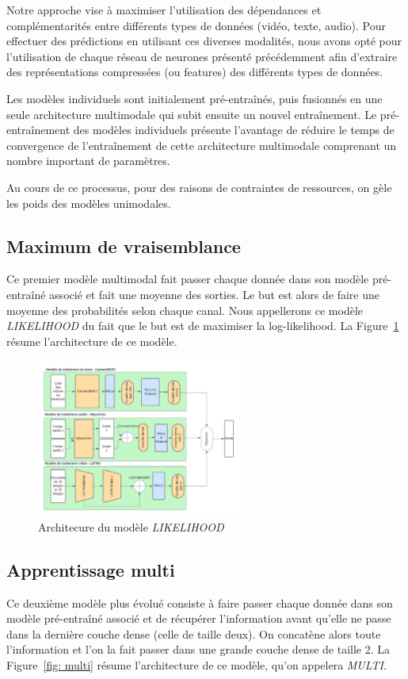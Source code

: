\documentclass[a4paper]{article}
\begin{document}
Notre approche vise à maximiser l'utilisation des dépendances et complémentarités entre différents types de données (vidéo, texte,
audio). Pour effectuer des prédictions en utilisant ces diverses modalités, nous avons opté pour l'utilisation de chaque réseau de
neurones présenté précédemment afin d'extraire des représentations compressées (ou features) des différents types de données. 

Les modèles individuels sont initialement pré-entraînés, puis fusionnés en une seule architecture multimodale qui subit ensuite un
nouvel entraînement. Le pré-entraînement des modèles individuels présente l'avantage de réduire le temps de convergence de
l'entraînement de cette architecture multimodale comprenant un nombre important de paramètres.

Au cours de ce processus, pour des raisons de contraintes de ressources, on gèle les poids des modèles unimodales.

\subsection{Maximum de vraisemblance}
Ce premier modèle multimodal fait passer chaque donnée dans son modèle pré-entraîné associé et fait une moyenne des sorties. Le but
est alors de faire une moyenne des probabilités selon chaque canal. Nous appellerons ce modèle \textit{LIKELIHOOD} du fait que le but
est de maximiser la log-likelihood.
La Figure~\ref{fig: likelihood} résume l'architecture de ce modèle.

\begin{figure}[H]
    \centering
    \includegraphics[width=0.6\textwidth]{Likelihood.png}
    \caption{Architecure du modèle \textit{LIKELIHOOD}}
    \label{fig: likelihood}
\end{figure}

\subsection{Apprentissage multi}
Ce deuxième modèle plus évolué consiste à faire passer chaque donnée dans son modèle pré-entraîné associé et de récupérer
l'information avant qu'elle ne passe dans la dernière couche dense (celle de taille deux). On concatène alors toute l'information 
et l'on la fait passer dans une grande couche dense de taille 2.
La Figure~\ref{fig: multi} résume l'architecture de ce modèle, qu'on appelera \textit{MULTI}.
\end{document}
